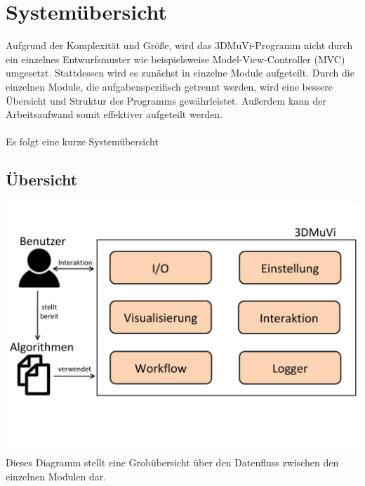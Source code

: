 \section{Systemübersicht}
Aufgrund der Komplexität und Größe, wird das 3DMuVi-Programm nicht durch ein einzelnes Entwurfsmuster wie beispielsweise Model-View-Controller (MVC) umgesetzt. Stattdessen wird es zunächst in einzelne Module aufgeteilt.
Durch die einzelnen Module, die aufgabenspezifisch getrennt werden, wird eine bessere Übersicht und Struktur des Programms gewährleistet. Außerdem kann der Arbeitsaufwand somit effektiver aufgeteilt werden.
\\\\
Es folgt eine kurze Systemübersicht
\subsection{Übersicht}
\includegraphics[width=1\textwidth]{img/SUebersicht.pdf}
\newpage
Dieses Diagramm stellt eine Grobübersicht über den Datenfluss zwischen den einzelnen Modulen dar.
\\
